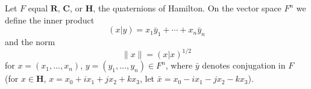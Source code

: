 Let $F$ equal $\mathbf{R}$, $\mathbf{C}$, or $\mathbf{H}$, the quaternions of Hamilton. On the vector space $F^n$ we define the inner product
$$(x|y) = x_1 \bar{y}_1 + \cdots + x_n \bar{y}_n$$
and the norm
$$\|x\| = (x|x)^{1/2}$$
for $x = (x_1, \ldots, x_n)$, $y = (y_1, \ldots, y_n) \in F^n$, where $\bar{y}$ denotes conjugation in $F$ (for $x \in \mathbf{H}$, $x = x_0 + ix_1 + jx_2 + kx_3$, let $\bar{x} = x_0 - ix_1 - jx_2 - kx_3$).
